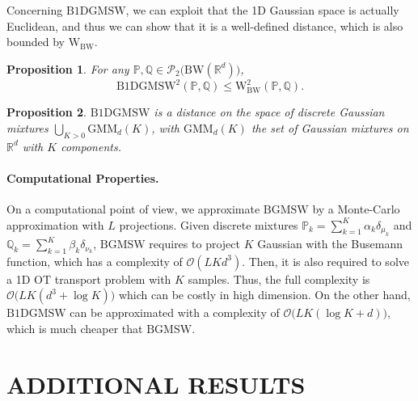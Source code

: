 \documentclass[twoside]{article}
\newtheorem{proposition}{Proposition}
\newcommand{\cP}{\mathcal{P}}
\newcommand{\bP}{\mathbb{P}}
\newcommand{\bQ}{\mathbb{Q}}
\newcommand{\cO}{\mathcal{O}}
\newcommand{\W}{\mathrm{W}}
\newcommand{\R}{\mathbb{R}}
\newcommand{\bw}{\mathrm{BW}}
\newcommand{\smwbg}{\mathrm{BGMSW}}
\newcommand{\smwbdg}{\mathrm{B1DGMSW}}
\begin{document}
Concerning $\smwbdg$, we can exploit that the 1D Gaussian space is actually Euclidean, and thus we can show that it is a well-defined distance, which is also bounded by $\W_{\bw}$.

\begin{proposition} \label{prop:bound_bdgmsw}
    For any $\bP,\bQ\in \cP_2\big(\bw(\R^d)\big)$,
    \begin{equation}
        \smwbdg^2(\bP,\bQ) \le \W_{\bw}^2(\bP,\bQ).
    \end{equation}
\end{proposition}

\begin{proposition} \label{prop:bdgmsw_distance}
    $\smwbdg$ is a distance on the space of discrete Gaussian mixtures $\bigcup_{K>0} \mathrm{GMM}_d(K)$, with $\mathrm{GMM}_d(K)$ the set of Gaussian mixtures on $\R^d$ with $K$ components.
\end{proposition}





\paragraph{Computational Properties.}


On a computational point of view, we approximate $\smwbg$ by a Monte-Carlo approximation with $L$ projections. Given discrete mixtures $\bP_k=\sum_{k=1}^K \alpha_k \delta_{\mu_k}$ and $\bQ_k=\sum_{k=1}^K \beta_k \delta_{\nu_k}$, $\smwbg$ requires to project $K$ Gaussian with the Busemann function, which has a complexity of $\cO(LKd^3)$. Then, it is also required to solve a 1D OT transport problem with $K$ samples. Thus, the full complexity is $\cO\big(LK(d^3+\log K)\big)$ which can be costly in high dimension. On the other hand, $\smwbdg$ can be approximated with a complexity of $\cO\big(LK(\log K + d)\big)$, which is much cheaper that $\smwbg$.



\section{ADDITIONAL RESULTS} \label{app:add_result}
\end{document}
